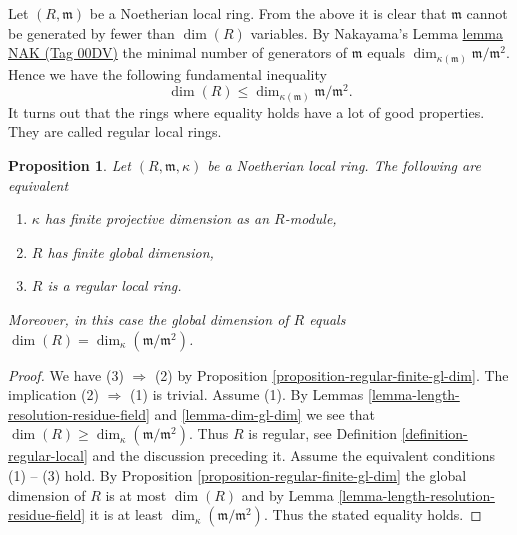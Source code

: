 \documentclass{amsart}
\theoremstyle{plain}
\newtheorem{proposition}[subsection]{Proposition}
\theoremstyle{definition}
\theoremstyle{remark}
\numberwithin{equation}{subsection}
\begin{document}
Let $(R, \mathfrak m)$ be a Noetherian local ring.
From the above it is clear that $\mathfrak m$ cannot be
generated by fewer than $\dim(R)$ variables.
By Nakayama's Lemma \href{https://stacks.math.columbia.edu/tag/00DV}{lemma NAK (Tag 00DV)} the minimal number
of generators of $\mathfrak m$ equals $\dim_{\kappa(\mathfrak m)}
\mathfrak m/\mathfrak m^2$. Hence we have the following
fundamental inequality
$$
\dim(R) \leq \dim_{\kappa(\mathfrak m)} \mathfrak m/\mathfrak m^2.
$$
It turns out that the rings where equality holds
have a lot of good properties. They are called
regular local rings.



\begin{proposition}
\label{proposition-finite-gl-dim-regular}
Let $(R, \mathfrak m, \kappa)$ be a Noetherian local ring.
The following are equivalent
\begin{enumerate}
\item $\kappa$ has finite projective dimension as an $R$-module,
\item $R$ has finite global dimension,
\item $R$ is a regular local ring.
\end{enumerate}
Moreover, in this case the global dimension of $R$ equals
$\dim(R) = \dim_\kappa(\mathfrak m/\mathfrak m^2)$.
\end{proposition}

\begin{proof}
We have (3) $\Rightarrow$ (2) by
Proposition \ref{proposition-regular-finite-gl-dim}.
The implication (2) $\Rightarrow$ (1) is trivial.
Assume (1). By Lemmas \ref{lemma-length-resolution-residue-field}
and \ref{lemma-dim-gl-dim} we see that
$\dim(R) \geq \dim_\kappa(\mathfrak m /\mathfrak m^2)$.
Thus $R$ is regular, see Definition
\ref{definition-regular-local} and the discussion preceding it.
Assume the equivalent conditions (1) -- (3) hold.
By Proposition \ref{proposition-regular-finite-gl-dim}
the global dimension of $R$ is at most $\dim(R)$ and by
Lemma \ref{lemma-length-resolution-residue-field}
it is at least $\dim_\kappa(\mathfrak m/\mathfrak m^2)$.
Thus the stated equality holds.
\end{proof}
\end{document}
